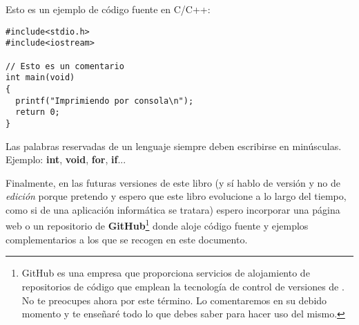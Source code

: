\begin{ejemplo}
Esto es un ejemplo de código fuente en C/C++:
\begin{lstlisting}
#include<stdio.h>
#include<iostream>
    
// Esto es un comentario
int main(void)
{
  printf("Imprimiendo por consola\n");
  return 0;
}
\end{lstlisting}
\end{ejemplo}

\begin{consejo}
Las palabras reservadas de un lenguaje siempre deben escribirse en minúsculas. Ejemplo: \textbf{int}, \textbf{void}, \textbf{for}, \textbf{if}...
\end{consejo}

Finalmente, en las futuras versiones de este libro (y sí hablo de versión y no de \textit{edición} porque pretendo y espero que 
este libro evolucione a lo largo del tiempo, como si de una aplicación informática se tratara) espero incorporar una página web
o un repositorio de \textbf{GitHub}\footnote{GitHub es una empresa que proporciona servicios de alojamiento de repositorios de 
código que emplean la tecnología de control de versiones de . No te preocupes ahora por este término. Lo comentaremos
en su debido momento y te enseñaré todo lo que debes saber para hacer uso del mismo.} donde aloje código fuente y 
ejemplos complementarios a los que se recogen en este documento.
